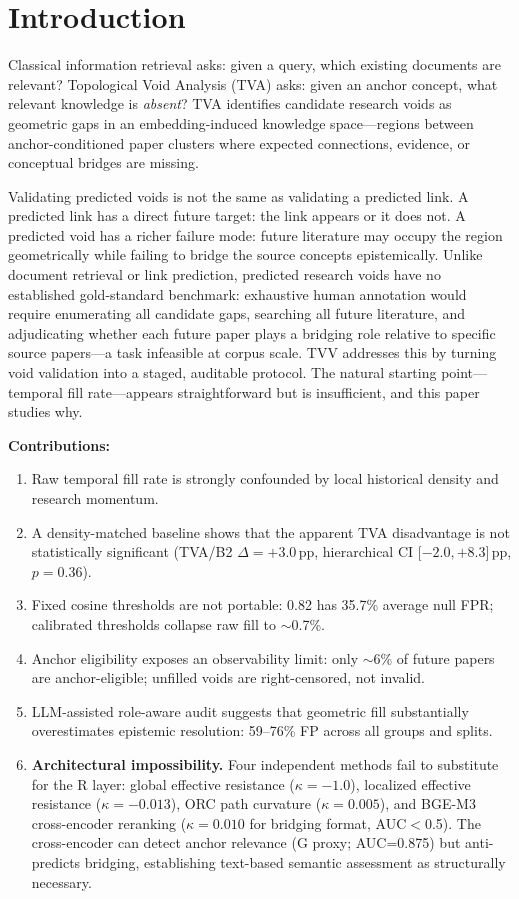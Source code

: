 \documentclass[11pt,twocolumn]{article}
\newcommand{\tva}{\textsf{TVA}}
\begin{document}
\section{Introduction}

Classical information retrieval asks: given a query, which existing documents are
relevant? Topological Void Analysis (\tva{}) asks: given an anchor concept, what
relevant knowledge is \emph{absent}?
\tva{} identifies candidate research voids as geometric gaps in an embedding-induced
knowledge space---regions between anchor-conditioned paper clusters where expected
connections, evidence, or conceptual bridges are missing.

Validating predicted voids is not the same as validating a predicted link.
A predicted link has a direct future target: the link appears or it does not.
A predicted void has a richer failure mode: future literature may occupy the region
geometrically while failing to bridge the source concepts epistemically.
Unlike document retrieval or link prediction, predicted research voids have no
established gold-standard benchmark: exhaustive human annotation would require
enumerating all candidate gaps, searching all future literature, and adjudicating
whether each future paper plays a bridging role relative to specific source papers---a
task infeasible at corpus scale. TVV addresses this by turning void validation into a
staged, auditable protocol. The natural starting point---temporal fill rate---appears
straightforward but is insufficient, and this paper studies why.

\textbf{Contributions:}
\begin{enumerate}
\item Raw temporal fill rate is strongly confounded by local historical density and
  research momentum.
\item A density-matched baseline shows that the apparent \tva{} disadvantage is not
  statistically significant (\tva{}/B2 $\Delta{=}{+}3.0$\,pp, hierarchical CI $\lbrack{-}2.0,+8.3\rbrack$\,pp, $p{=}0.36$).
\item Fixed cosine thresholds are not portable: 0.82 has 35.7\% average null FPR;
  calibrated thresholds collapse raw fill to $\sim$0.7\%.
\item Anchor eligibility exposes an observability limit: only $\sim$6\% of future
  papers are anchor-eligible; unfilled voids are right-censored, not invalid.
\item LLM-assisted role-aware audit suggests that geometric fill substantially
  overestimates epistemic resolution: 59--76\% FP across all groups and splits.
\item \textbf{Architectural impossibility.} Four independent methods fail to substitute
  for the R layer: global effective resistance ($\kappa{=}-1.0$), localized effective
  resistance ($\kappa{=}-0.013$), ORC path curvature ($\kappa{=}0.005$), and
  BGE-M3 cross-encoder reranking ($\kappa{=}0.010$ for bridging format, AUC$<$0.5).
  The cross-encoder can detect anchor relevance (G proxy; AUC=0.875) but anti-predicts
  bridging, establishing text-based semantic assessment as structurally necessary.
\end{enumerate}
\end{document}
